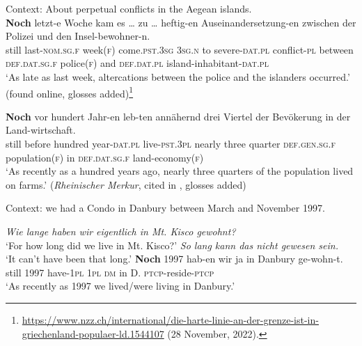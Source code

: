 \begin{exe}
	\ex\label{exAppendixGermanTimeScalar1}
	Context: About perpetual conflicts in the Aegean islands.\\
	\gll \textbf{Noch} letzt-e Woche kam es … zu … heftig-en Auseinandersetzung-en zwischen der Polizei und den Insel-bewohner-n.\\
	still last-\textsc{nom}.\textsc{sg}.\textsc{f} week(\textsc{f}) come.\textsc{pst}.3\textsc{sg} 3\textsc{sg}.\textsc{n} {} to {} severe-\textsc{dat}.\textsc{pl} conflict-\textsc{pl} between \textsc{def}.\textsc{dat}.\textsc{sg}.\textsc{f} police(\textsc{f}) and \textsc{def}.\textsc{dat}.\textsc{pl} island-inhabitant-\textsc{dat}.\textsc{pl}\\
	\glt \lq As late as last week, altercations between the police and the islanders occurred.\rq{ }(found online, glosses added)\footnote{\url{https://www.nzz.ch/international/die-harte-linie-an-der-grenze-ist-in-griechenland-populaer-ld.1544107} (28 November, 2022).}
	
	\ex\label{exAppendixGermanTimeScalar2}
	\gll \textbf{Noch} vor hundert Jahr-en leb-ten annähernd drei Viertel der Bevökerung in der Land-wirtschaft.\\
	still before hundred year-\textsc{dat}.\textsc{pl} live-\textsc{pst}.3\textsc{pl} nearly three quarter \textsc{def}.\textsc{gen}.\textsc{sg}.\textsc{f} population(\textsc{f}) in \textsc{def}.\textsc{dat}.\textsc{sg}.\textsc{f} land-economy(\textsc{f})\\
	\glt \lq As recently as a hundred years ago, nearly three quarters of the population lived on farms.' (\textit{Rheinischer Merkur}, cited in \cite[51]{Shetter1966}, glosses added)
	
	\ex Context: we had a Condo in Danbury between March and November 1997.\label{exAppendixGermanTimeScalar3}
	\begin{xlist}
	 \textit{Wie lange haben wir eigentlich in Mt. Kisco gewohnt?}\\
\lq For how long did we live in Mt. Kisco?'
	 \textit{So lang kann das nicht gewesen sein.}\\
\lq It can't have been that long.'
	\exi{}\gll \textbf{Noch} 1997 hab-en wir ja in Danbury ge-wohn-t.\\
still 1997 have-1\textsc{pl} 1\textsc{pl} \textsc{dm} in D. \textsc{ptcp}-reside-\textsc{ptcp}\\
	\glt \lq As recently as 1997 we lived/were living in Danbury.\rq{ }\parencite[30 fn13]{Beck2020}
	\end{xlist}
	

\end{exe}
